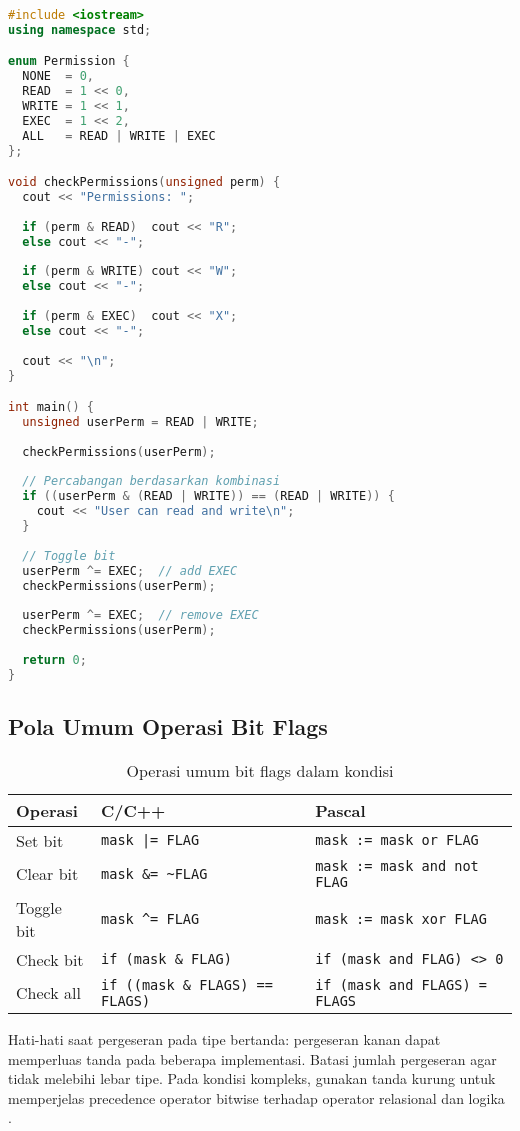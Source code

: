 \documentclass[../main.tex]{subfiles}
\begin{document}
\begin{lstlisting}[language=C++, caption={Bitwise flags dengan switch di C++}]
#include <iostream>
using namespace std;

enum Permission {
  NONE  = 0,
  READ  = 1 << 0,
  WRITE = 1 << 1,
  EXEC  = 1 << 2,
  ALL   = READ | WRITE | EXEC
};

void checkPermissions(unsigned perm) {
  cout << "Permissions: ";
  
  if (perm & READ)  cout << "R";
  else cout << "-";
  
  if (perm & WRITE) cout << "W";
  else cout << "-";
  
  if (perm & EXEC)  cout << "X";
  else cout << "-";
  
  cout << "\n";
}

int main() {
  unsigned userPerm = READ | WRITE;
  
  checkPermissions(userPerm);
  
  // Percabangan berdasarkan kombinasi
  if ((userPerm & (READ | WRITE)) == (READ | WRITE)) {
    cout << "User can read and write\n";
  }
  
  // Toggle bit
  userPerm ^= EXEC;  // add EXEC
  checkPermissions(userPerm);
  
  userPerm ^= EXEC;  // remove EXEC
  checkPermissions(userPerm);
  
  return 0;
}
\end{lstlisting}

\subsection{Pola Umum Operasi Bit Flags}
\begin{table}[H]
  \centering
  \caption{Operasi umum bit flags dalam kondisi}
  \begin{tabular}{@{}lll@{}}
    \toprule
    Operasi & C/C++ & Pascal \\
    \midrule
    Set bit & \texttt{mask |= FLAG} & \texttt{mask := mask or FLAG} \\
    Clear bit & \texttt{mask \&= \~{}FLAG} & \texttt{mask := mask and not FLAG} \\
    Toggle bit & \texttt{mask \^{}= FLAG} & \texttt{mask := mask xor FLAG} \\
    Check bit & \texttt{if (mask \& FLAG)} & \texttt{if (mask and FLAG) {\textless}{\textgreater} 0} \\
    Check all & \texttt{if ((mask \& FLAGS) == FLAGS)} & \texttt{if (mask and FLAGS) = FLAGS} \\
    \bottomrule
  \end{tabular}
\end{table}

Hati-hati saat pergeseran pada tipe bertanda: pergeseran kanan dapat memperluas tanda pada beberapa implementasi. Batasi jumlah pergeseran agar tidak melebihi lebar tipe. Pada kondisi kompleks, gunakan tanda kurung untuk memperjelas precedence operator bitwise terhadap operator relasional dan logika \parencite{iso-c-draft-n1570,cpp-reference}.
\end{document}
